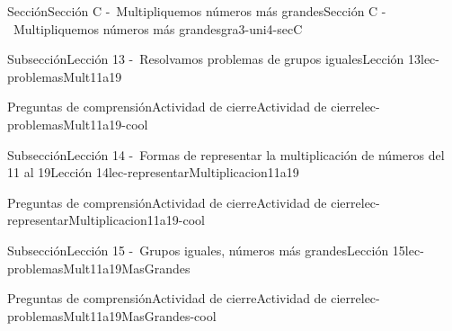 \begin{sectionptx}{Sección}{Sección C -~Multipliquemos números más grandes}{}{Sección C -~Multipliquemos números más grandes}{}{}{gra3-uni4-secC}
\typeout{************************************************}
%
\begin{subsectionptx}{Subsección}{Lección 13 -~Resolvamos problemas de grupos iguales}{}{Lección 13}{}{}{lec-problemasMult11a19}
%
%
%
%
\typeout{************************************************}
\typeout{************************************************}
%
\begin{reading-questions-subsubsection}{Preguntas de comprensión}{Actividad de cierre}{}{Actividad de cierre}{}{}{lec-problemasMult11a19-cool}
%
\end{reading-questions-subsubsection}
\end{subsectionptx}
%
%
\typeout{************************************************}
\typeout{************************************************}
%
\begin{subsectionptx}{Subsección}{Lección 14 -~Formas de representar la multiplicación de números del 11 al 19}{}{Lección 14}{}{}{lec-representarMultiplicacion11a19}
%
%
\typeout{************************************************}
\typeout{************************************************}
%
\begin{reading-questions-subsubsection-numberless}{Preguntas de comprensión}{Actividad de cierre}{}{Actividad de cierre}{}{}{lec-representarMultiplicacion11a19-cool}
%
\end{reading-questions-subsubsection-numberless}
\end{subsectionptx}
%
%
\typeout{************************************************}
\typeout{************************************************}
%
\begin{subsectionptx}{Subsección}{Lección 15 -~Grupos iguales, números más grandes}{}{Lección 15}{}{}{lec-problemasMult11a19MasGrandes}
%
%
\typeout{************************************************}
\typeout{************************************************}
%
\begin{reading-questions-subsubsection-numberless}{Preguntas de comprensión}{Actividad de cierre}{}{Actividad de cierre}{}{}{lec-problemasMult11a19MasGrandes-cool}
%
\end{reading-questions-subsubsection-numberless}

\end{subsectionptx}
\end{sectionptx}
